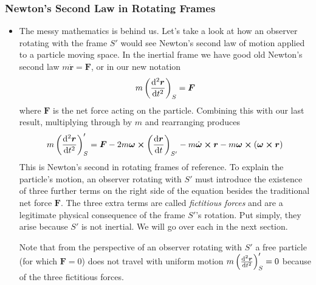 \documentclass[11pt, a4paper]{article}
\newcommand{\bdot}[1]{\dot{\bm{#1}}} %
\newcommand{\bddot}[1]{\ddot{\bm{#1}}} %
\begin{document}
\subsubsection{Newton's Second Law in Rotating Frames}
\begin{itemize}
	\item The messy mathematics is behind us. Let's take a look at how an observer rotating with the frame $ S' $ would see Newton's second law of motion applied to a particle moving space. In the inertial frame we have good old Newton's second law $ m \bddot{r} = \bm{F} $, or in our new notation
	\begin{equation*}
		m \left(\dv[2]{\bm{r}}{t}\right)_{S} = \bm{F}
	\end{equation*}
	where $ \bm{F} $ is the net force acting on the particle. Combining this with our last result, multiplying through by $ m $ and rearranging produces
	\begin{equation*}
		m\left(\dv[2]{\bm{r}}{t}\right)_{S}' = \bm{F} - 2m\bm{\omega} \cross  \left(\dv{\bm{r}}{t}\right)_{S'} - m\bdot{\omega} \cross \bm{r} - m\bm{\omega} \cross (\bm{\omega} \cross \bm{r})
	\end{equation*}
	This is Newton's second in rotating frames of reference. To explain the particle's motion, an observer rotating with $ S' $ must introduce the existence of three further terms on the right side of the equation besides the traditional net force $ \bm{F} $. The three extra terms are called \textit{fictitious forces} and are a legitimate physical consequence of the frame $ S' $'s rotation. Put simply, they arise because $ S' $ is not inertial. We will go over each in the next section.
	
	Note that from the perspective of an observer rotating with $ S' $ a free particle (for which $ \bm{F} = 0 $) does not travel with uniform motion $ m\left(\dv[2]{\bm{r}}{t}\right)_{S}' = 0 $ because of the three fictitious forces.
	

	

\end{itemize}
\end{document}
